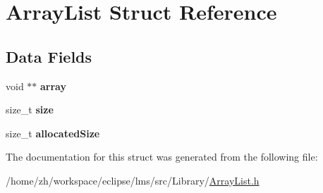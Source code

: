 \hypertarget{structArrayList}{\section{Array\-List Struct Reference}
\label{structArrayList}
}
\subsection*{Data Fields}
\begin{DoxyCompactItemize}
\item 
\hypertarget{structArrayList_a2e8a6b0eb4dda2a873616d291337fa01}{void $\ast$$\ast$ {\bfseries array}}\label{structArrayList_a2e8a6b0eb4dda2a873616d291337fa01}

\item 
\hypertarget{structArrayList_acc412139cb8cf1d2a61c5026233d7f7b}{size\-\_\-t {\bfseries size}}\label{structArrayList_acc412139cb8cf1d2a61c5026233d7f7b}

\item 
\hypertarget{structArrayList_a03abf74baef02127c297a439f825a3d5}{size\-\_\-t {\bfseries allocated\-Size}}\label{structArrayList_a03abf74baef02127c297a439f825a3d5}

\end{DoxyCompactItemize}


The documentation for this struct was generated from the following file\-:\begin{DoxyCompactItemize}
\item 
/home/zh/workspace/eclipse/lms/src/\-Library/\hyperlink{ArrayList_8h}{Array\-List.\-h}\end{DoxyCompactItemize}
